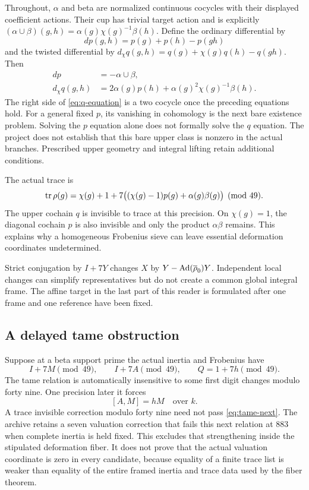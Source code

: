 Throughout, $\alpha$ and beta are normalized continuous cocycles with their displayed coefficient actions. Their cup has trivial target action and is explicitly $(\alpha\cup\beta)(g,h)=\alpha(g)\chi(g)^{-1}\beta(h)$. Define the ordinary differential by
\[
dp(g,h)=p(g)+p(h)-p(gh)
\]
and the twisted differential by $d_\chi q(g,h)=q(g)+\chi(g)q(h)-q(gh)$. Then
\begin{align}
dp&=-\alpha\cup\beta,\label{eq:p-equation}\\
d_\chi q(g,h)&=2\alpha(g)p(h)+\alpha(g)^2\chi(g)^{-1}\beta(h).\label{eq:q-equation}
\end{align}
The right side of \eqref{eq:q-equation} is a two cocycle once the preceding equations hold. For a general fixed $p$, its vanishing in cohomology is the next bare existence problem. Solving the $p$ equation alone does not formally solve the $q$ equation. The project does not establish that this bare upper class is nonzero in the actual branches. Prescribed upper geometry and integral lifting retain additional conditions.

The actual trace is
\begin{equation}\label{eq:adjointtrace}
\operatorname{tr}\rho(g)=\chi(g)+1
+7\bigl((\chi(g)-1)p(g)+\alpha(g)\beta(g)\bigr)\pmod{49}.
\end{equation}
The upper cochain $q$ is invisible to trace at this precision. On $\chi(g)=1$, the diagonal cochain $p$ is also invisible and only the product $\alpha\beta$ remains. This explains why a homogeneous Frobenius sieve can leave essential deformation coordinates undetermined.

Strict conjugation by $I+7Y$ changes $X$ by $Y-\operatorname{Ad}(\overline\rho_0)Y$. Independent local changes can simplify representatives but do not create a common global integral frame. The affine target in the last part of this reader is formulated after one frame and one reference have been fixed.

\subsection{A delayed tame obstruction}
Suppose at a beta support prime the actual inertia and Frobenius have
\[
I+7M\pmod{49},\qquad I+7A\pmod{49},\qquad Q=1+7h\pmod{49}.
\]
The tame relation is automatically insensitive to some first digit changes modulo forty nine. One precision later it forces
\begin{equation}\label{eq:tame-next}
[A,M]=hM\quad\text{over }k.
\end{equation}
A trace invisible correction modulo forty nine need not pass \eqref{eq:tame-next}. The archive retains a seven valuation correction that fails this next relation at $883$ when complete inertia is held fixed. This excludes that strengthening inside the stipulated deformation fiber. It does not prove that the actual valuation coordinate is zero in every candidate, because equality of a finite trace list is weaker than equality of the entire framed inertia and trace data used by the fiber theorem.
